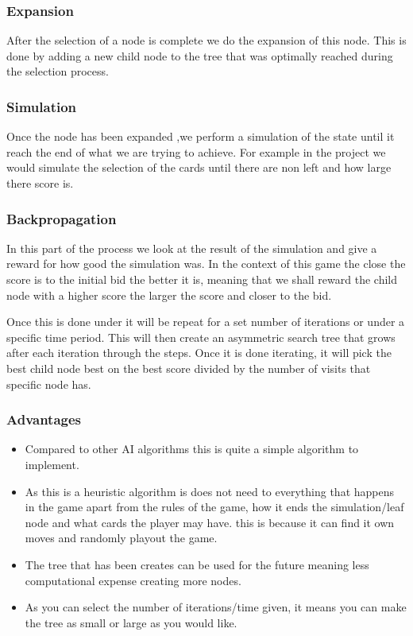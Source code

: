 \subsubsection{Expansion}
After the selection of a node is complete we do the expansion of this node. This is done by adding a new child node to the tree that was optimally reached during the selection process\cite{mctsSource}.
\subsubsection{Simulation}
Once the node has been expanded ,we perform a simulation of the state until it reach the end of what we are trying to achieve. For example in the project we would simulate the selection of the cards until there are non left and how large there score is.
\subsubsection{Backpropagation}
In this part of the process we look at the result of the simulation and give a reward for how good the simulation was. In the context of this game the close the score is to the initial bid the better it is, meaning that we shall reward the child node with a higher score the larger the score and closer to the bid.


Once this is done under it will be repeat for a set number of iterations or under a specific time period. This will then create an asymmetric search tree that grows after each iteration through the steps. Once it is done iterating, it will pick the best child node best on the best score divided by the number of visits that specific node has.
\subsubsection{Advantages}
\begin{itemize}
\item Compared to other AI algorithms this is quite a simple algorithm to implement.
\item As this is a heuristic algorithm is does not need to everything that happens in the game apart from the rules of the game, how it ends the simulation/leaf node and what cards the player may have. this is because it can find it own moves and randomly playout the game.
\item The tree that has been creates can be used for the future meaning less computational expense creating more nodes.
\item As you can select the number of iterations/time given, it means you can make the tree as small or large as you would like. 
\end{itemize}
